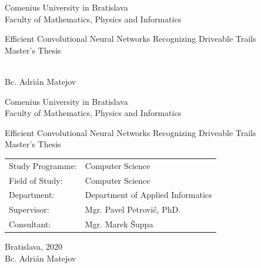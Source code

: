 \documentclass[12pt, oneside]{book}  %
\def\mfrok{2020}
\def\mfnazov{Efficient Convolutional Neural Networks Recognizing Driveable Trails}
\def\mftyp{Master's Thesis}
\def\mfautor{Bc. Adrián Matejov}
\def\mfskolitel{Mgr. Pavel Petrovič, PhD.}
\def\mfkonzultant{Mgr. Marek Šuppa}
\def\mfmiesto{Bratislava, \mfrok}
\def\mfodbor{Computer Science}
\def\program{Computer Science}
\def\mfpracovisko{Department of Applied Informatics}
\begin{document}
\frontmatter


\thispagestyle{empty}

\begin{center}
\sc\large
Comenius University in Bratislava\\
Faculty of Mathematics, Physics and Informatics

\vfill

{\LARGE\mfnazov}\\
\mftyp
\end{center}

\vfill

{\sc\large 
\noindent \mfrok\\
\mfautor
}

\cleardoublepage


\thispagestyle{empty}
\noindent

\begin{center}
\sc  
\large
Comenius University in Bratislava\\
Faculty of Mathematics, Physics and Informatics

\vfill

{\LARGE\mfnazov}\\
\mftyp
\end{center}

\vfill

\noindent
\begin{tabular}{ll}
Study Programme: & \program \\
Field of Study: & \mfodbor \\
Department: & \mfpracovisko \\
Supervisor: & \mfskolitel \\
Consultant: & \mfkonzultant \\
\end{tabular}

\vfill


\noindent \mfmiesto\\
\mfautor

\cleardoublepage


\end{document}
